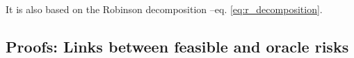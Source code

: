 \documentclass[a4paper,num-refs]{oup-contemporary}%
\newtheorem{definition}{Definition}
\begin{document}
It is also based on the Robinson decomposition --eq. \ref{eq:r_decomposition}. %

\subsection{Proofs: Links between feasible and oracle risks}\label{apd:proofs}






\end{document}
